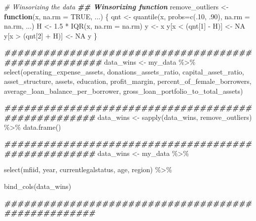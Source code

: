 \documentclass[a4paper,nobind]{templates/ociamthesis}
\newenvironment{Shaded}{\begin{snugshade}}{\end{snugshade}}
\newcommand{\AttributeTok}[1]{\textcolor[rgb]{0.77,0.63,0.00}{#1}}
\newcommand{\CommentTok}[1]{\textcolor[rgb]{0.56,0.35,0.01}{\textit{#1}}}
\newcommand{\ConstantTok}[1]{\textcolor[rgb]{0.00,0.00,0.00}{#1}}
\newcommand{\ControlFlowTok}[1]{\textcolor[rgb]{0.13,0.29,0.53}{\textbf{#1}}}
\newcommand{\DecValTok}[1]{\textcolor[rgb]{0.00,0.00,0.81}{#1}}
\newcommand{\DocumentationTok}[1]{\textcolor[rgb]{0.56,0.35,0.01}{\textbf{\textit{#1}}}}
\newcommand{\FloatTok}[1]{\textcolor[rgb]{0.00,0.00,0.81}{#1}}
\newcommand{\FunctionTok}[1]{\textcolor[rgb]{0.00,0.00,0.00}{#1}}
\newcommand{\NormalTok}[1]{#1}
\newcommand{\OtherTok}[1]{\textcolor[rgb]{0.56,0.35,0.01}{#1}}
\newcommand{\SpecialCharTok}[1]{\textcolor[rgb]{0.00,0.00,0.00}{#1}}
\renewenvironment{Shaded}
{
  \vspace{10pt}%
  \begin{snugshade}%
}{%
  \end{snugshade}%
  \vspace{8pt}%
}
\begin{document}
\begin{Shaded}
\begin{Highlighting}[]
\CommentTok{\# Winsorizing the data}
\DocumentationTok{\#\# Winsorizing function}
\NormalTok{remove\_outliers }\OtherTok{\textless{}{-}} \ControlFlowTok{function}\NormalTok{(x, }\AttributeTok{na.rm =} \ConstantTok{TRUE}\NormalTok{, ...) \{}
\NormalTok{  qnt }\OtherTok{\textless{}{-}} \FunctionTok{quantile}\NormalTok{(x, }\AttributeTok{probs=}\FunctionTok{c}\NormalTok{(.}\DecValTok{10}\NormalTok{, .}\DecValTok{90}\NormalTok{), }\AttributeTok{na.rm =}\NormalTok{ na.rm, ...)}
\NormalTok{  H }\OtherTok{\textless{}{-}} \FloatTok{1.5} \SpecialCharTok{*} \FunctionTok{IQR}\NormalTok{(x, }\AttributeTok{na.rm =}\NormalTok{ na.rm)}
\NormalTok{  y }\OtherTok{\textless{}{-}}\NormalTok{ x}
\NormalTok{  y[x }\SpecialCharTok{\textless{}}\NormalTok{ (qnt[}\DecValTok{1}\NormalTok{] }\SpecialCharTok{{-}}\NormalTok{ H)] }\OtherTok{\textless{}{-}} \ConstantTok{NA}
\NormalTok{  y[x }\SpecialCharTok{\textgreater{}}\NormalTok{ (qnt[}\DecValTok{2}\NormalTok{] }\SpecialCharTok{+}\NormalTok{ H)] }\OtherTok{\textless{}{-}} \ConstantTok{NA}
\NormalTok{  y}
\NormalTok{\}}

\DocumentationTok{\#\#\#\#\#\#\#\#\#\#\#\#\#\#\#\#\#\#\#\#\#\#\#\#\#\#\#\#\#\#\#\#\#\#\#\#\#\#\#\#\#\#\#\#\#\#\#\#\#\#\#\#\#}
\NormalTok{data\_wins }\OtherTok{\textless{}{-}}\NormalTok{ my\_data }\SpecialCharTok{\%\textgreater{}\%} \FunctionTok{select}\NormalTok{(operating\_expense\_assets, }
\NormalTok{                             donations\_assets\_ratio, }
\NormalTok{                             capital\_asset\_ratio, }
\NormalTok{                             asset\_structure, assets, }
\NormalTok{                             education, profit\_margin,}
\NormalTok{                             percent\_of\_female\_borrowers,}
\NormalTok{                             average\_loan\_balance\_per\_borrower,}
\NormalTok{                             gross\_loan\_portfolio\_to\_total\_assets)}

\DocumentationTok{\#\#\#\#\#\#\#\#\#\#\#\#\#\#\#\#\#\#\#\#\#\#\#\#\#\#\#\#\#\#\#\#\#\#\#\#\#\#\#\#\#\#\#\#\#\#\#\#\#\#\#\#}
\NormalTok{data\_wins }\OtherTok{\textless{}{-}} \FunctionTok{sapply}\NormalTok{(data\_wins, remove\_outliers) }\SpecialCharTok{\%\textgreater{}\%} \FunctionTok{data.frame}\NormalTok{()}

\DocumentationTok{\#\#\#\#\#\#\#\#\#\#\#\#\#\#\#\#\#\#\#\#\#\#\#\#\#\#\#\#\#\#\#\#\#\#\#\#\#\#\#\#\#\#\#\#\#\#\#\#\#\#\#\#}
\NormalTok{data\_wins }\OtherTok{\textless{}{-}}\NormalTok{ my\_data }\SpecialCharTok{\%\textgreater{}\%} 
  
  \FunctionTok{select}\NormalTok{(mfiid, year, currentlegalstatus, age, region) }\SpecialCharTok{\%\textgreater{}\%} 
  
  \FunctionTok{bind\_cols}\NormalTok{(data\_wins)}

\DocumentationTok{\#\#\#\#\#\#\#\#\#\#\#\#\#\#\#\#\#\#\#\#\#\#\#\#\#\#\#\#\#\#\#\#\#\#\#\#\#\#\#\#\#\#\#\#\#\#\#\#\#\#\#\#}
\end{Highlighting}
\end{Shaded}
\end{document}
